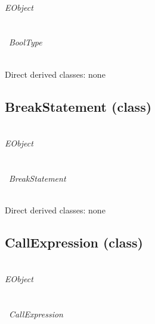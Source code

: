 ~\\ \noindent \emph{EObject} \\
\hook~ \\
\indent\hook~ \\
\indent\indent\hook~\emph{BoolType}

~\\ \noindent Direct derived classes:
none

\begin{description}



{\featdocuChiObjectposition}
\end{description}


\subsection{BreakStatement (class)}\label{chiclass:BreakStatement}
\clsdocuBreakStatement

~\\ \noindent \emph{EObject} \\
\hook~ \\
\indent\hook~ \\
\indent\indent\hook~\emph{BreakStatement}

~\\ \noindent Direct derived classes:
none

\begin{description}



{\featdocuChiObjectposition}
\end{description}


\subsection{CallExpression (class)}\label{chiclass:CallExpression}
\clsdocuCallExpression

~\\ \noindent \emph{EObject} \\
\hook~ \\
\indent\hook~ \\
\indent\indent\hook~\emph{CallExpression}

